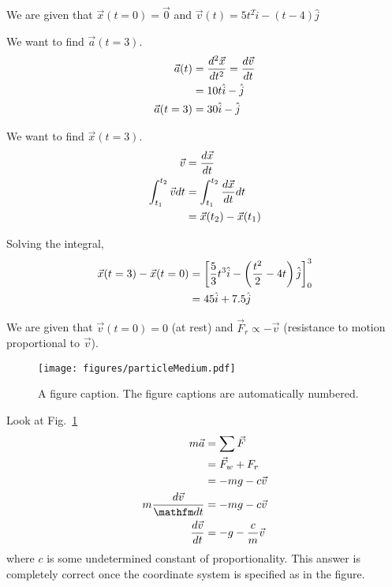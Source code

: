 \begin{subquestions}
\subquestion We are given that $\vec{x}(t=0) = \vec{0}$ and $\vec{v}(t) = 5t^2 \hat{i} - (t-4)\hat{j}$
\item We want to find $\vec{a}(t=3)$.
\begin{align}
   \vec{a}(t) & = \frac{d^2 \vec{x}}{dt^2} = \frac{d\vec{v}}{dt} \nonumber \\
   &= 10 t \hat{i}  - \hat{j}  \nonumber \\
   \vec{a} (t=3) &= 30 \hat{i} - \hat{j}
\end{align}

\item We want to find $\vec{x}(t=3)$.
\begin{align}
   \vec{v} &= \frac{d\vec{x}}{dt} \nonumber \\
   \int_{t_1}^{t_2} \vec{v} dt &=  \int_{t_1}^{t_2} \frac{d\vec{x}}{dt}  dt\nonumber \\
         &=\vec{x}(t_2) - \vec{x}(t_1)
\end{align}

Solving the integral, 
\begin{align}
   \vec{x}(t=3) - \vec{x}(t=0) &= \left[ \frac{5}{3}t^3 \hat{i} - \left(\frac{t^2}{2} - 4t\right)\hat{j}\right]^{3}_0 \nonumber \\
   &= 45 \hat{i} + 7.5 \hat{j}
\end{align}


\subquestion We are given that $\vec{v}(t=0) = 0$ (at rest) and $\vec{F}_r \propto -\vec{v}$ (resistance to motion proportional to $\vec{v}$). 


\begin{figure}
\begin{center}
\texttt{[image: figures/particleMedium.pdf]}
\caption{\label{2015:q5:fig:particle1} A figure caption. The figure captions are
automatically numbered.}
\end{center}
\end{figure}

Look at Fig.~\ref{2015:q5:fig:particle1}
\begin{align}
   m \vec{a} &= \sum \vec{F} \nn\\
    &= \vec{F}_w + F_r \nn \\
   &= -m g - c \vec{v} \nn \\
   m \frac{d\vec{v}}{\dd t} &= -mg - c \vec{v} \nn \\
    \frac{d\vec{v}}{dt} &= -g - \frac{c}{m} \vec{v}
\end{align}
where $c$ is some undetermined constant of proportionality. This answer is completely correct once the coordinate system is specified as in the figure.


\end{subquestions}
